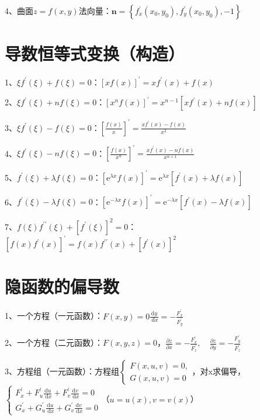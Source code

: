 4、曲面$z=f(x, y)$法向量：$\boldsymbol{n}=\left\{f_{x}^{\prime}\left(x_{0}, y_{0}\right),f_{y}^{\prime}\left(x_{0}, y_{0}\right),-1\right\}$

\section{导数恒等式变换（构造）}

1、$\xi f^{\prime}(\xi)+f(\xi)=0$：$[x f(x)]^{\prime}=x f^{\prime}(x)+f(x)$

2、$\xi f^{\prime}(\xi)+n f(\xi)=0$：$\left[x^{n} f(x)\right]^{\prime}=x^{n-1}\left[x f^{\prime}(x)+n f(x)\right]$

3、$\xi f^{\prime}(\xi)-f(\xi)=0$：$\left[\frac{f(x)}{x}\right]^{\prime}=\frac{x f^{\prime}(x)-f(x)}{x^{2}}$

4、$\xi f^{\prime}(\xi)-n f(\xi)=0$：$\left[\frac{f(x)}{x^{n}}\right]^{\prime}=\frac{x f^{\prime}(x)-n f(x)}{x^{n+1}}$

5、$f^{\prime}(\xi)+\lambda f(\xi)=0$：$\left[\mathrm{e}^{\lambda x} f(x)\right]^{\prime}=\mathrm{e}^{\lambda x}\left[f^{\prime}(x)+\lambda f(x)\right]$

6、$f^{\prime}(\xi)-\lambda f(\xi)=0$：$\left[\mathrm{e}^{-\lambda x} f(x)\right]^{\prime}=\mathrm{e}^{-\lambda x}\left[f^{\prime}(x)-\lambda f(x)\right]$

7、$f(\xi) f^{\prime \prime}(\xi)+\left[f^{\prime}(\xi)\right]^{2}=0$：$\left[f(x) f^{\prime}(x)\right]^{\prime}=f(x) f^{\prime \prime}(x)+\left[f^{\prime}(x)\right]^{2}$

\section{隐函数的偏导数}

1、一个方程（一元函数）：$F(x, y)=0$$\frac{\mathrm{d} y}{\mathrm{~d} x}=-\frac{F_{x}^{\prime}}{F_{y}^{\prime}}$

2、一个方程（二元函数）：$F(x, y, z)=0$，$\frac{\partial z}{\partial x}=-\frac{F_{x}^{\prime}}{F_{z}^{\prime}}, \quad \frac{\partial z}{\partial y}=-\frac{F_{y}^{\prime}}{F_{z}^{\prime}}$

3、方程组（一元函数）：方程组$\left\{\begin{array}{l}F(x, u, v)=0,  \\ G(x, u, v)=0\end{array}\right. $，对x求偏导，$\left\{\begin{array}{l} F_{x}^{\prime}+F_{u}^{\prime} \frac{\mathrm{d} u}{\mathrm{~d} x}+F_{v}^{\prime} \frac{\mathrm{d} v}{\mathrm{~d} x}=0 \\ G_{x}^{\prime}+G_{u}^{\prime} \frac{\mathrm{d} u}{\mathrm{~d} x}+G_{v}^{\prime} \frac{\mathrm{d} v}{\mathrm{~d} x}=0 \end{array}\right.$（$u=u(x), v=v(x)$）

